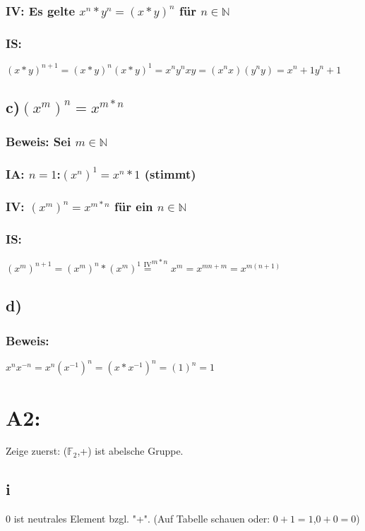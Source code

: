 \documentclass[11pt]{scrartcl}
\begin{document}
\subsubsection*{IV: Es gelte $x^n*y^n = (x*y)^n$ für $n \in \mathbb{N}$}

\subsubsection*{IS:}
$(x*y)^{n+1} = (x*y)^n (x*y)^1 = x^n y^n x y = (x^n x)(y^n y) = x^n+1 y^n+1$

\subsection{c)$ (x^m)^n = x^{m*n}$}
\subsubsection*{Beweis: Sei $m \in \mathbb{N}$}
\subsubsection*{IA: $n=1$:$ (x^n)^1 = x^n*1$ (stimmt)}
\subsubsection*{IV: $(x^m)^n = x^{m*n}$ für ein $n \in \mathbb{N}$}
\subsubsection*{IS:}
$(x^m)^{n+1} = (x^m)^n * (x^m)^1 \overset{\mathrm{IV}}{=} ^{m*n} x^m = x^{mn+m} = x^{m(n+1)}$

\subsection{d)}
\subsubsection*{Beweis:}
$x^n x^{-n} = x^n (x^{-1})^n = (x*x^{-1})^n = (1)^n = 1$

\section{A2:}
Zeige zuerst: ($\mathbb F_{2}$,+) ist abelsche Gruppe.
\subsection{i}
0 ist neutrales Element bzgl. "+". (Auf Tabelle schauen  oder: $0+1=1$,$0+0=0$)
\end{document}
